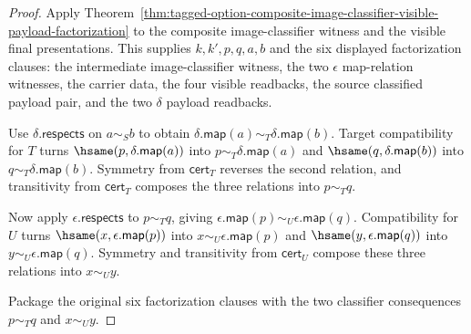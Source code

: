 \begin{proof}
Apply
Theorem~\ref{thm:tagged-option-composite-image-classifier-visible-payload-factorization}
to the composite image-classifier witness and the visible final presentations.
This supplies $k,k',p,q,a,b$ and the six displayed factorization clauses:
the intermediate image-classifier witness, the two $\epsilon$ map-relation
witnesses, the carrier data, the four visible readbacks, the source classified
payload pair, and the two $\delta$ payload readbacks.

Use $\delta.\mathsf{respects}$ on $a\sim_S b$ to obtain
$\delta.\mathsf{map}(a)\sim_T\delta.\mathsf{map}(b)$. Target compatibility for
$T$ turns $\hsame(p,\delta.\mathsf{map}(a))$ into
$p\sim_T\delta.\mathsf{map}(a)$ and
$\hsame(q,\delta.\mathsf{map}(b))$ into
$q\sim_T\delta.\mathsf{map}(b)$. Symmetry from $\mathsf{cert}_T$ reverses the
second relation, and transitivity from $\mathsf{cert}_T$ composes the three
relations into $p\sim_T q$.

Now apply $\epsilon.\mathsf{respects}$ to $p\sim_T q$, giving
$\epsilon.\mathsf{map}(p)\sim_U\epsilon.\mathsf{map}(q)$. Compatibility for $U$
turns $\hsame(x,\epsilon.\mathsf{map}(p))$ into
$x\sim_U\epsilon.\mathsf{map}(p)$ and
$\hsame(y,\epsilon.\mathsf{map}(q))$ into
$y\sim_U\epsilon.\mathsf{map}(q)$. Symmetry and transitivity from
$\mathsf{cert}_U$ compose these three relations into $x\sim_U y$.

Package the original six factorization clauses with the two classifier
consequences $p\sim_T q$ and $x\sim_U y$.
\end{proof}

